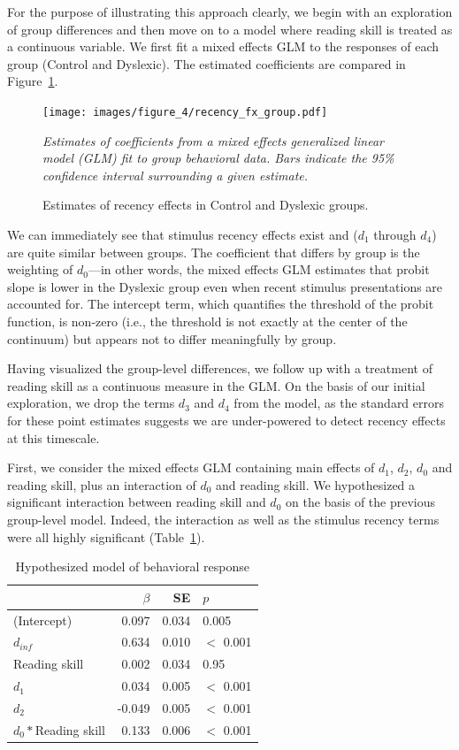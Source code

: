 \documentclass[../uwthesis.tex]{subfiles}
\begin{document}
For the purpose of illustrating this approach clearly, we begin with an exploration of group differences and then move on to a model where reading skill is treated as a continuous variable. We first fit a mixed effects GLM to the responses of each group (Control and Dyslexic). The estimated coefficients are compared in Figure~\ref{fig:recency_fx_group}.

 \begin{figure}
    \centering
    \caption{Estimates of recency effects in Control and Dyslexic groups.}
    \label{fig:recency_fx_group}
    \texttt{[image: images/figure\_4/recency\_fx\_group.pdf]}
    \item \textit{Estimates of coefficients from a mixed effects generalized linear model (GLM) fit to group behavioral data. Bars indicate the 95\% confidence interval surrounding a given estimate.}
\end{figure}
 
We can immediately see that stimulus recency effects exist and ($d_1$ through $d_4$) are quite similar between groups. The coefficient that differs by group is the weighting of $d_0$---in other words, the mixed effects GLM estimates that probit slope is lower in the Dyslexic group even when recent stimulus presentations are accounted for. The intercept term, which quantifies the threshold of the probit function, is non-zero (i.e., the threshold is not exactly at the center of the continuum) but appears not to differ meaningfully by group. 

Having visualized the group-level differences, we follow up with a treatment of reading skill as a continuous measure in the GLM. On the basis of our initial exploration, we drop the terms $d_3$ and $d_4$ from the model, as the standard errors for these point estimates suggests we are under-powered to detect recency effects at this timescale. 

First, we consider the mixed effects GLM containing main effects of $d_1$, $d_2$, $d_0$ and reading skill, plus an interaction of $d_0$ and reading skill. We hypothesized a significant interaction between reading skill and $d_0$ on the basis of the previous group-level model. Indeed, the interaction as well as the stimulus recency terms were all highly significant (Table~\ref{tab:GLM_model}). 

\begin{table}
\centering
\caption{Hypothesized model of behavioral response} \label{tab:GLM_model}
    \begin{tabular}{lrrl}
    \toprule
      & $\beta$ & SE & $p$\\
    \midrule
    (Intercept) & 0.097 & 0.034 & 0.005\\
    $d_{inf}$ & 0.634 & 0.010 & $<$ 0.001\\
    Reading skill & 0.002 & 0.034 & 0.95\\
    $d_1$ & 0.034 & 0.005 & $<$ 0.001\\
    $d_2$ & -0.049 & 0.005 & $<$ 0.001\\
    $d_{0}*$Reading skill & 0.133 & 0.006 & $<$ 0.001\\
    \bottomrule
    \end{tabular}
\end{table}
\end{document}
